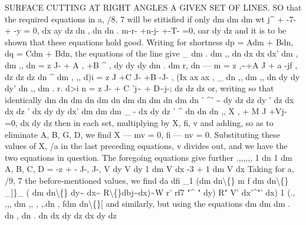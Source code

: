 \documentclass[11pt,a4paper]{book}
\begin{document}
SURFACE CUTTING AT RIGHT ANGLES A GIVEN SET OF LINES.
SO that the required equations
in
a,
/8, 7
will be
stitisfied
if only
dm
dm
dm
wt j\textasciicircum{} + \guillemotleft{} -7- + -y = 0,
dx
ay
dz
dn
,
dn
dn
.
m-r- +n-j-
+-T- =0,
oar
dy
dz
and
it
is
to be shown that these equations
hold good.
Writing
for
shortness
dp = Adm + Bdn,
dq = Cdm + Bdn,
the
equations
of
the
line
give
\_
dm
. dm
,, dn
dx
dx
dx'
dm
, dm
,, dn
= z J- + A
, +B \textasciicircum{}
,
dy
dy
dy
dm
. dm
r, dn
--- m = z ,\textasciitilde{}+A
J
+ a -jf
,
dz
dz
dz
dn
\textasciicircum{} dm
,
,, d)i
= z
J +C J- +B -J-
,
(Ix
ax
ax
, \_
dn
,, dm
,, dn
dy
dy
dy'
dn
,, dm
.
r. d>i
n = z J- + C 'j\textasciitilde{} + D\textasciitilde{}j-;
dz
dz
dz
or, writing
so that
identically
dm dn
dm dn
dm dn
dm dn
dm dn
dm dn
'
\textasciicircum{}'
\textasciitilde{} dy dz
dz dy
'
dz dx
dx dz
'
dx dy
dy dx'
dm
dm
dm \_ -
dx
dy
dz
'
\textasciicircum{} dn
dn
dn
,,
X
,
+ M J
+Vj- =0,
dx
dy
dz
then
in
each
set,
multiplying
by
X,
fi,
v
and
adding,
so
as
to
eliminate A,
B,
G, D,
we
find
X --- mv = 0,
fi --- nv = 0.
Substituting
these
values
of
X,
/a
in
the
last
preceding
equations,
v
divides
out,
and
we have the two equations in question.
The foregoing equations give further
.,,,,,,
1 dn
1 dm
A, B,
C, D = -z + - J-,
J-,
V dy
V dy
1 dm
V dx
-3 +
1 dm
V dx
Taking
for
a,
/9, 7 the before-mentioned
values, we
find
da
dfi \_1 (dm
dn\textbackslash\{\}
m f
dm
dn\textbackslash\{\} \_]\}\_ (
dm
dn\textbackslash\{\}
dy\textasciitilde{} dx\textasciitilde{} R\textbackslash\{\}dbj\textasciitilde{}dx)\textasciitilde{}W r' rf7 "\textasciicircum{} " dy)
R" V' dx'\textasciicircum{}"' dx)
1
(.,
,,, dm
,,
,
,.dn
,
fdm
dn\textbackslash\{\}[
and
similarly, but using the equations
dm
dm
dm
.
dn
,
dn
. dn
dx
dy
dz
dx
dy
dz
\end{document}
